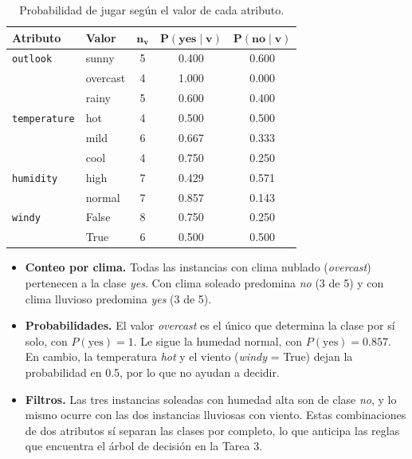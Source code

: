 \documentclass[11pt,letterpaper]{article}
\begin{document}
\begin{table}[htbp]
\centering
\caption{Probabilidad de jugar según el valor de cada atributo.}
\label{tab:probabilidades}
\begin{tabular}{llccc}
\hline
\textbf{Atributo} & \textbf{Valor} & $\boldsymbol{n_v}$ & $\boldsymbol{P(\text{yes} \mid v)}$ & $\boldsymbol{P(\text{no} \mid v)}$ \\
\hline
\texttt{outlook}     & sunny    & 5 & 0.400 & 0.600 \\
                     & overcast & 4 & 1.000 & 0.000 \\
                     & rainy    & 5 & 0.600 & 0.400 \\
\hline
\texttt{temperature} & hot      & 4 & 0.500 & 0.500 \\
                     & mild     & 6 & 0.667 & 0.333 \\
                     & cool     & 4 & 0.750 & 0.250 \\
\hline
\texttt{humidity}    & high     & 7 & 0.429 & 0.571 \\
                     & normal   & 7 & 0.857 & 0.143 \\
\hline
\texttt{windy}       & False    & 8 & 0.750 & 0.250 \\
                     & True     & 6 & 0.500 & 0.500 \\
\hline
\end{tabular}
\end{table}

\begin{itemize}
    \item \textbf{Conteo por clima.} Todas las instancias con clima nublado (\textit{overcast}) pertenecen a la clase \textit{yes}. Con clima soleado predomina \textit{no} (3 de 5) y con clima lluvioso predomina \textit{yes} (3 de 5).
    \item \textbf{Probabilidades.} El valor \textit{overcast} es el único que determina la clase por sí solo, con $P(\text{yes}) = 1$. Le sigue la humedad normal, con $P(\text{yes}) = 0.857$. En cambio, la temperatura \textit{hot} y el viento (\textit{windy} = True) dejan la probabilidad en 0.5, por lo que no ayudan a decidir.
    \item \textbf{Filtros.} Las tres instancias soleadas con humedad alta son de clase \textit{no}, y lo mismo ocurre con las dos instancias lluviosas con viento. Estas combinaciones de dos atributos sí separan las clases por completo, lo que anticipa las reglas que encuentra el árbol de decisión en la Tarea 3.
\end{itemize}
\end{document}
